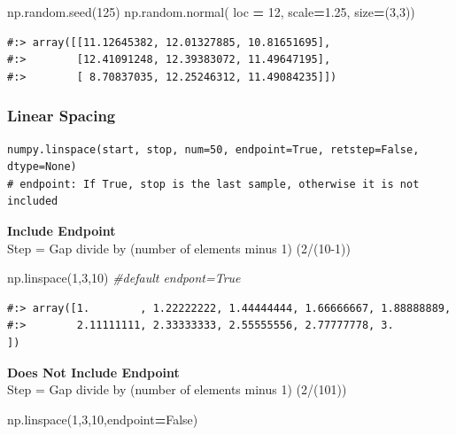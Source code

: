 \documentclass[
]{book}
\newenvironment{Shaded}{\begin{snugshade}}{\end{snugshade}}
\newcommand{\CommentTok}[1]{\textcolor[rgb]{0.37,0.37,0.37}{\textit{#1}}}
\newcommand{\DecValTok}[1]{\textcolor[rgb]{0.06,0.06,0.06}{#1}}
\newcommand{\FloatTok}[1]{\textcolor[rgb]{0.06,0.06,0.06}{#1}}
\newcommand{\NormalTok}[1]{#1}
\newcommand{\OperatorTok}[1]{\textcolor[rgb]{0.43,0.43,0.43}{\textbf{#1}}}
\newcommand{\VariableTok}[1]{\textcolor[rgb]{0,0,0}{#1}}
\begin{document}
\begin{Shaded}
\begin{Highlighting}[]
\NormalTok{np.random.seed(}\DecValTok{125}\NormalTok{)}
\NormalTok{np.random.normal( loc }\OperatorTok{=} \DecValTok{12}\NormalTok{, scale}\OperatorTok{=}\FloatTok{1.25}\NormalTok{, size}\OperatorTok{=}\NormalTok{(}\DecValTok{3}\NormalTok{,}\DecValTok{3}\NormalTok{))}
\end{Highlighting}
\end{Shaded}

\begin{verbatim}
#:> array([[11.12645382, 12.01327885, 10.81651695],
#:>        [12.41091248, 12.39383072, 11.49647195],
#:>        [ 8.70837035, 12.25246312, 11.49084235]])
\end{verbatim}

\hypertarget{linear-spacing}{%
\subsubsection{Linear Spacing}\label{linear-spacing}}

\begin{verbatim}
numpy.linspace(start, stop, num=50, endpoint=True, retstep=False, dtype=None)
# endpoint: If True, stop is the last sample, otherwise it is not included
\end{verbatim}

\textbf{Include Endpoint}\\
Step = Gap divide by (number of elements minus 1) (2/(10-1))

\begin{Shaded}
\begin{Highlighting}[]
\NormalTok{np.linspace(}\DecValTok{1}\NormalTok{,}\DecValTok{3}\NormalTok{,}\DecValTok{10}\NormalTok{) }\CommentTok{#default endpont=True}
\end{Highlighting}
\end{Shaded}

\begin{verbatim}
#:> array([1.        , 1.22222222, 1.44444444, 1.66666667, 1.88888889,
#:>        2.11111111, 2.33333333, 2.55555556, 2.77777778, 3.        ])
\end{verbatim}

\textbf{Does Not Include Endpoint}\\
Step = Gap divide by (number of elements minus 1) (2/(101))

\begin{Shaded}
\begin{Highlighting}[]
\NormalTok{np.linspace(}\DecValTok{1}\NormalTok{,}\DecValTok{3}\NormalTok{,}\DecValTok{10}\NormalTok{,endpoint}\OperatorTok{=}\VariableTok{False}\NormalTok{)}
\end{Highlighting}
\end{Shaded}
\end{document}
